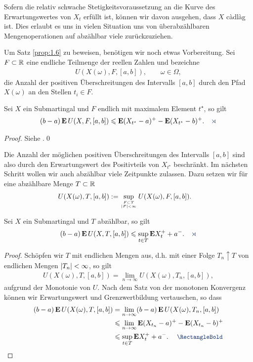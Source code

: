Sofern die relativ schwache Stetigkeitsvoraussetzung an die Kurve des
Erwartungswertes von $X_t$ erfüllt ist, können wir davon ausgehen, dass $X$
càdlàg ist. Dies erlaubt es uns in vielen Situation uns von überabzählbaren
Mengenoperationen auf abzählbar viele zurückzuziehen.

Um Satz \ref{prop:1.6} zu
beweisen, benötigen wir noch etwas Vorbereitung.
Sei $F\subset \mathbb{R}$ eine endliche Teilmenge der reellen Zahlen und bezeichne
\begin{align*}
U(X(\omega),F,[a,b]),\qquad \omega\in\Omega,
\end{align*}
die Anzahl der positiven Überschreitungen des Intervalls $[a,b]$ durch den Pfad
$X(\omega)$ an den Stellen $t_i\in F$.

\begin{prop*}
Sei $X$ ein Submartingal und $F$ endlich mit maximalem Element $t^\star$, so
gilt
\begin{align*}
(b-a) \,\E\, U(X,F,[a,b]) \le \E(X_{t^\star} - a)^+  - \E(X_{t^\star}-b)^+.\fish 
\end{align*}
\end{prop*}
\begin{proof}
Siehe \cite[Satz 11.5]{WTDippon:2009}.\qed
\end{proof}

Die Anzahl der möglichen positiven Überschreitungen des Intervalls $[a,b]$ sind
also durch den Erwartungswert des Positivteils von $X_{t^\star}$ beschränkt. Im
nächsten Schritt wollen wir auch abzählbar viele Zeitpunkte zulassen. Dazu
setzen wir für eine abzählbare Menge $T\subset \mathbb{R}$
\begin{align*}
U(X(\omega),T,[a,b]) &\defl \sup_{\atop{F\subset T}{\abs{F}< \infty}}
U(X(\omega),F,[a,b]).
\end{align*}

\begin{prop*}
Sei $X$ ein Submartingal und $T$ abzählbar, so gilt
\begin{align*}
(b-a) \,\E\, U(X,T,[a,b]) \le \sup_{t\in T} \E X_t^+ + a^- .\fish 
\end{align*}
\end{prop*}
\begin{proof}
Schöpfen wir $T$ mit endlichen Mengen aus, d.h. mit einer Folge $T_n\uparrow T$
von endlichen Mengen $\lvert T_n\rvert < \infty$, so gilt
\begin{align*}
U(X(\omega),T,[a,b])= \lim\limits_{n\to \infty} U(X(\omega),T_n,[a,b]), 
\end{align*}
aufgrund der Monotonie von $U$. Nach dem Satz von der monotonen Konvergenz
können wir Erwartungswert und Grenzwertbildung vertauschen, so dass
\begin{align*}
(b-a)\,\E\, U(X(\omega),T,[a,b]) &= 
\lim\limits_{n\to\infty}
(b-a)\,\E\, U(X(\omega),T_n,[a,b])\\
&\le 
\lim\limits_{n\to\infty}
\E(X_{t_n}-a)^+ - \E(X_{t_n}-b)^+\\
&\le \sup_{t\in T} \E X_t^+ + a^-.\qed
\end{align*} 
\end{proof}

